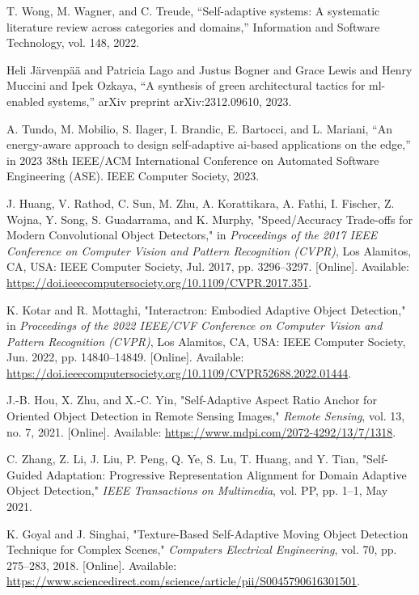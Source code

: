 \begin{thebibliography}{00}
T. Wong, M. Wagner, and C. Treude, “Self-adaptive systems: A systematic literature review across categories and domains,” Information and Software Technology, vol. 148, 2022.

Heli J{\"a}rvenp{\"a}{\"a} and Patricia Lago and Justus Bogner and Grace Lewis and Henry Muccini and Ipek Ozkaya, “A synthesis of green architectural tactics for ml-enabled systems,” arXiv preprint arXiv:2312.09610, 2023.

A. Tundo, M. Mobilio, S. Ilager, I. Brandic, E. Bartocci, and L. Mariani, “An energy-aware approach to design self-adaptive ai-based applications on the edge,” in 2023 38th IEEE/ACM International Conference on Automated Software Engineering (ASE). IEEE Computer Society, 2023.

J. Huang, V. Rathod, C. Sun, M. Zhu, A. Korattikara, A. Fathi, I. Fischer, Z. Wojna, Y. Song, S. Guadarrama, and K. Murphy,
"Speed/Accuracy Trade-offs for Modern Convolutional Object Detectors,"
in \textit{Proceedings of the 2017 IEEE Conference on Computer Vision and Pattern Recognition (CVPR)}, Los Alamitos, CA, USA: IEEE Computer Society, Jul. 2017, pp. 3296--3297. 
[Online]. Available: \href{https://doi.ieeecomputersociety.org/10.1109/CVPR.2017.351}{https://doi.ieeecomputersociety.org/10.1109/CVPR.2017.351}.

K. Kotar and R. Mottaghi,
"Interactron: Embodied Adaptive Object Detection,"
in \textit{Proceedings of the 2022 IEEE/CVF Conference on Computer Vision and Pattern Recognition (CVPR)}, Los Alamitos, CA, USA: IEEE Computer Society, Jun. 2022, pp. 14840--14849. 
[Online]. Available: \href{https://doi.ieeecomputersociety.org/10.1109/CVPR52688.2022.01444}{https://doi.ieeecomputersociety.org/10.1109/CVPR52688.2022.01444}.

J.-B. Hou, X. Zhu, and X.-C. Yin,
"Self-Adaptive Aspect Ratio Anchor for Oriented Object Detection in Remote Sensing Images,"
\textit{Remote Sensing}, vol. 13, no. 7, 2021. 
[Online]. Available: \href{https://www.mdpi.com/2072-4292/13/7/1318}{https://www.mdpi.com/2072-4292/13/7/1318}.

C. Zhang, Z. Li, J. Liu, P. Peng, Q. Ye, S. Lu, T. Huang, and Y. Tian,
"Self-Guided Adaptation: Progressive Representation Alignment for Domain Adaptive Object Detection,"
\textit{IEEE Transactions on Multimedia}, vol. PP, pp. 1--1, May 2021.

K. Goyal and J. Singhai,
"Texture-Based Self-Adaptive Moving Object Detection Technique for Complex Scenes,"
\textit{Computers Electrical Engineering}, vol. 70, pp. 275--283, 2018.
[Online]. Available: \href{https://www.sciencedirect.com/science/article/pii/S0045790616301501}{https://www.sciencedirect.com/science/article/pii/S0045790616301501}.


\end{thebibliography}
